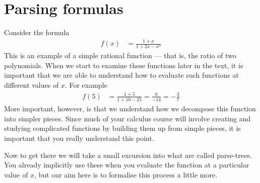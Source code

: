 \section{Parsing formulas}
\label{sec parsing}
Consider the formula
\begin{align*}
  f(x) &= \frac{1+x}{1+2x-x^2}
\end{align*}
  This is an example of a simple rational function --- that is, the ratio of
two polynomials. When we start to examine these functions later in the text, it
is important that we are able to understand how to evaluate such functions at
different values of $x$. For example
\begin{align*}
  f(5) &= \frac{1+5}{1+10-25} = \frac{6}{-14} = -\frac{3}{7}
\end{align*}
More important, however, is that we understand how we decompose this function
into simpler pieces. Since much of your calculus course will involve creating and
studying complicated functions by building them up from simple pieces, it is important
that you really understand this point.


Now to get there we will take a small excursion into what are called
parse-trees. You already implicitly use these when you evaluate the function at
a particular value of $x$, but our aim here is to formalise this
process a little more.

